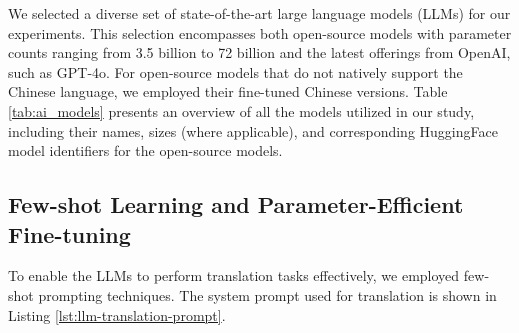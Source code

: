\documentclass[conference]{IEEEtran}
\begin{document}
We selected a diverse set of state-of-the-art large language models (LLMs) for our experiments. This selection encompasses both open-source models with parameter counts ranging from 3.5 billion to 72 billion and the latest offerings from OpenAI, such as GPT-4o. For open-source models that do not natively support the Chinese language, we employed their fine-tuned Chinese versions. Table \ref{tab:ai_models} presents an overview of all the models utilized in our study, including their names, sizes (where applicable), and corresponding HuggingFace model identifiers for the open-source models.


\begin{table}[htbp]
\caption{Overview of Large Language Models and Their Specifications}
\label{tab:ai_models}
\centering
{}
\end{table}

\subsection{Few-shot Learning and Parameter-Efficient Fine-tuning}

To enable the LLMs to perform translation tasks effectively, we employed few-shot prompting techniques. The system prompt used for translation is shown in Listing \ref{lst:llm-translation-prompt}.
\end{document}
